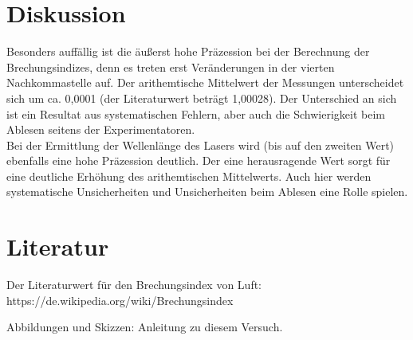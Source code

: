 \section{Diskussion}
\label{sec:Diskussion}

Besonders auffällig ist die äußerst hohe Präzession bei der Berechnung der Brechungsindizes, denn es treten erst Veränderungen in der vierten Nachkommastelle auf. Der arithemtische Mittelwert der Messungen unterscheidet sich um ca. 0,0001 (der Literaturwert beträgt 1,00028). Der Unterschied an sich ist ein Resultat aus systematischen Fehlern, aber auch die Schwierigkeit beim Ablesen seitens der Experimentatoren.\\
Bei der Ermittlung der Wellenlänge des Lasers wird (bis auf den zweiten Wert) ebenfalls eine hohe Präzession deutlich. Der eine herausragende Wert sorgt für eine deutliche Erhöhung des arithemtischen Mittelwerts. Auch hier werden systematische Unsicherheiten und Unsicherheiten beim Ablesen eine Rolle spielen.

\section{Literatur}

Der Literaturwert für den Brechungsindex von Luft: 
https://de.wikipedia.org/wiki/Brechungsindex

Abbildungen und Skizzen: Anleitung zu diesem Versuch.

